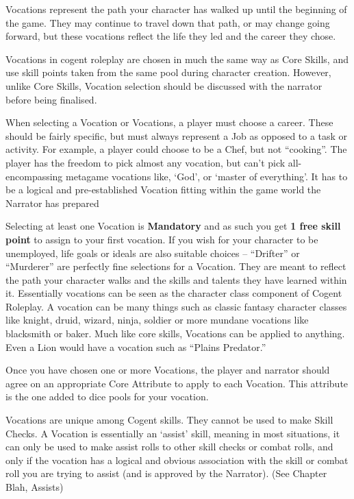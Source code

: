 Vocations represent the path your character has walked up until the beginning of the game. They may continue to travel down that path, or may change going forward, but these vocations reflect the life they led and the career they chose.

Vocations in cogent roleplay are chosen in much the same way as Core Skills, and use skill points taken from the same pool during character creation. However, unlike Core Skills, Vocation selection should be discussed with the narrator before being finalised.

When selecting a Vocation or Vocations, a player must choose a career. These should be fairly specific, but must always represent a Job as opposed to a task or activity. For example, a player could choose to be a Chef, but not “cooking”. The player has the freedom to pick almost any vocation, but can’t pick all-encompassing metagame vocations like, ‘God’, or ‘master of everything’. It has to be a logical and pre-established Vocation fitting within the game world the Narrator has prepared

Selecting at least one Vocation is \textbf{Mandatory} and as such you get \textbf{1 free skill point} to assign to your first vocation. If you wish for your character to be unemployed, life goals or ideals are also suitable choices – “Drifter” or “Murderer” are perfectly fine selections for a Vocation. They are meant to reflect the path your character walks and the skills and talents they have learned within it. Essentially vocations can be seen as the character class component of Cogent Roleplay. A vocation can be many things such as classic fantasy character classes like knight, druid, wizard, ninja, soldier or more mundane vocations like blacksmith or baker. Much like core skills, Vocations can be applied to anything. Even a Lion would have a vocation such as “Plains Predator.”

Once you have chosen one or more Vocations, the player and narrator should agree on an appropriate Core Attribute to apply to each Vocation. This attribute is the one added to dice pools for your vocation.

Vocations are unique among Cogent skills. They cannot be used to make Skill Checks. A Vocation is essentially an ‘assist’ skill, meaning in most situations, it can only be used to make assist rolls to other skill checks or combat rolls, and only if the vocation has a logical and obvious association with the skill or combat roll you are trying to assist (and is approved by the Narrator). (See Chapter Blah, Assists)

